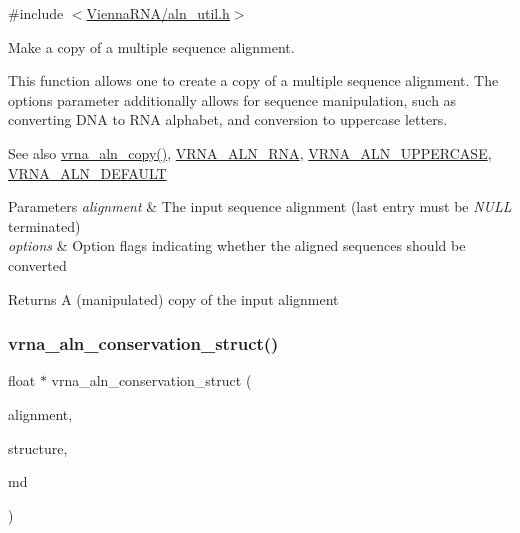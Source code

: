 {\ttfamily \#include $<$\mbox{\hyperlink{aln__util_8h}{Vienna\+R\+N\+A/aln\+\_\+util.\+h}}$>$}



Make a copy of a multiple sequence alignment. 

This function allows one to create a copy of a multiple sequence alignment. The {\ttfamily options} parameter additionally allows for sequence manipulation, such as converting D\+NA to R\+NA alphabet, and conversion to uppercase letters.

\begin{DoxySeeAlso}{See also}
\mbox{\hyperlink{group__aln__utils_ga08cdca592461436860daf9738279ce17}{vrna\+\_\+aln\+\_\+copy()}}, \mbox{\hyperlink{group__aln__utils_ga1a2aa60bcc51dc8e48c07bf146bd28c1}{V\+R\+N\+A\+\_\+\+A\+L\+N\+\_\+\+R\+NA}}, \mbox{\hyperlink{group__aln__utils_ga0de72fc917d72acafe862750a3a5e0bc}{V\+R\+N\+A\+\_\+\+A\+L\+N\+\_\+\+U\+P\+P\+E\+R\+C\+A\+SE}}, \mbox{\hyperlink{group__aln__utils_ga7437bcbc3142b266f1f3b086eb669092}{V\+R\+N\+A\+\_\+\+A\+L\+N\+\_\+\+D\+E\+F\+A\+U\+LT}}
\end{DoxySeeAlso}

\begin{DoxyParams}{Parameters}
{\em alignment} & The input sequence alignment (last entry must be {\itshape N\+U\+LL} terminated) \\
\hline
{\em options} & Option flags indicating whether the aligned sequences should be converted \\
\hline
\end{DoxyParams}
\begin{DoxyReturn}{Returns}
A (manipulated) copy of the input alignment 
\end{DoxyReturn}
\mbox{\label{group__aln__utils_gab6f16a2ea93f3bfd4d089cc8d448bb16}} 
\subsubsection{\texorpdfstring{vrna\+\_\+aln\+\_\+conservation\+\_\+struct()}{vrna\_aln\_conservation\_struct()}}
{\footnotesize\ttfamily float $\ast$ vrna\+\_\+aln\+\_\+conservation\+\_\+struct (\begin{DoxyParamCaption}\item[{const char $\ast$$\ast$}]{alignment,  }\item[{const char $\ast$}]{structure,  }\item[{const \mbox{\hyperlink{group__model__details_ga1f8a10e12a0a1915f2a4eff0b28ea17c}{vrna\+\_\+md\+\_\+t}} $\ast$}]{md }\end{DoxyParamCaption})}



